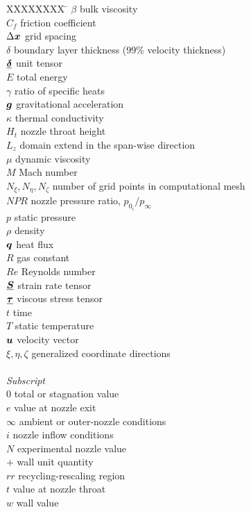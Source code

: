 \documentclass[]{aiaa-tc}%
\def\bgk#1{\mbox{\boldmath $#1$}}
\def\vec#1{\bgk{ #1}}
\def\ten#1{\underline{\bgk{ #1}}}
\begin{document}
\begin{tabbing}
  XXXXXXXX \= \kill%
  $\beta$ \> bulk viscosity \\
  $C_f$ \> friction coefficient \\
  $\Delta\vec{x}$ \> grid spacing \\
  $\delta$  \> boundary layer thickness (99\% velocity thickness) \\
  $\ten{\delta}$ \> unit tensor \\
  $E$ \> total energy \\
  $\gamma$ \> ratio of specific heats \\
  $\vec{g}$ \> gravitational acceleration \\
  $\kappa$ \> thermal conductivity \\
  $H_t$ \> nozzle throat height \\
  $L_z$ \> domain extend in the span-wise direction \\
  $\mu$ \> dynamic viscosity \\
  $M$ \> Mach number \\
  $N_\xi,N_\eta,N_\zeta$ \> number of grid points in computational mesh \\
  $NPR$ \> nozzle pressure ratio, $p_{0_{i}}/p_\infty$ \\
  $p$ \> static pressure \\
  $\rho$ \> density \\
  $\vec{q}$ \> heat flux \\
  $R$ \> gas constant \\
  $Re$ \> Reynolds number \\
  $\ten{S}$ \> strain rate tensor \\
  $\ten{\tau}$ \> viscous stress tensor \\
  $t$ \> time \\
  $T$ \> static temperature \\
  $\vec{u}$ \> velocity vector \\
  $\xi,\eta,\zeta$ \> generalized coordinate directions \\
  \\
  \textit{Subscript}\\
  $0$ \> total or stagnation value \\
  $e$ \> value at nozzle exit \\
  $\infty$ \> ambient or outer-nozzle conditions \\
  $i$ \> nozzle inflow conditions \\
  $N$ \> experimental nozzle value \\
  $+$ \> wall unit quantity \\
  $rr$ \> recycling-rescaling region \\
  $t$ \> value at nozzle throat \\
  $w$ \> wall value \\
 \end{tabbing}
 
\end{document}
